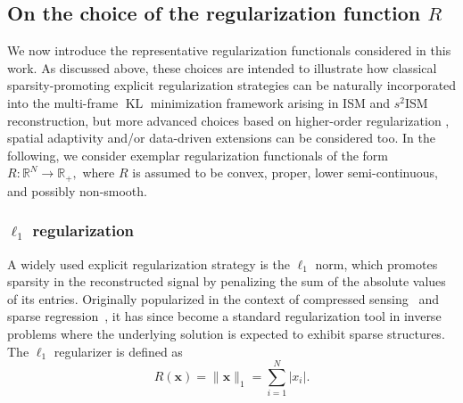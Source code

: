 \documentclass[letterpaper]{article}
\DeclareMathOperator*{\argmin}{arg\,min}
\begin{document}
\subsection{On the choice of the  regularization function $R$} \label{sec:reg}

We now introduce the representative regularization functionals considered in this work. As discussed above, these choices are intended to illustrate how classical sparsity-promoting explicit regularization strategies can be naturally incorporated into the multi-frame $\operatorname{KL}$ minimization framework arising in ISM and $s^2$ISM reconstruction, but more advanced choices based on higher-order regularization \cite{TGV}, spatial adaptivity \cite{TV_space_variant} and/or data-driven extensions \cite{hertrich2025learning} can be considered too. In the following, we consider
exemplar regularization functionals of the form
$
R : \mathbb{R}^N \to \mathbb{R}_{+},
$
where $R$ is assumed to be convex, proper, lower semi-continuous, and possibly non-smooth. 




\subsubsection{$\ell_1$ regularization}
\label{sec:l1_reg}

A widely used explicit regularization strategy is the $\ell_1$ norm, which promotes sparsity in the reconstructed signal by penalizing the sum of the absolute values of its entries. Originally popularized in the context of compressed sensing~\cite{Candes} and sparse regression~\cite{tibshirani1996regression}, it has since become a standard regularization tool in inverse problems where the underlying solution is expected to exhibit sparse structures. The $\ell_1$ regularizer is defined as
\begin{equation}
\label{eq:l1_norm}
    R(\mathbf{x})
    =
    \|\mathbf{x}\|_1
    =
    \sum_{i=1}^{N} |x_i|.
\end{equation}
\end{document}
